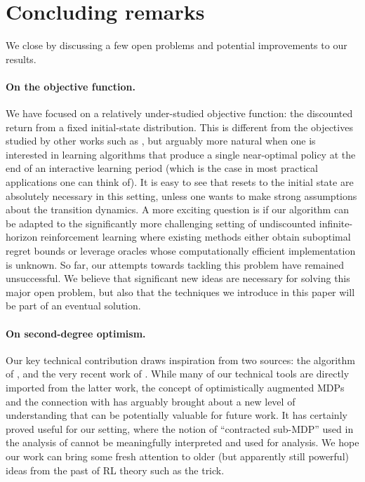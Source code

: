 \section{Concluding remarks}\label{sec:conclusion}

We close by discussing a few open problems and potential improvements to our results.

\paragraph{On the objective function.} We have focused on a relatively under-studied objective function: the discounted return from a fixed initial-state distribution. This is different from the objectives studied by other works such as \citet{liu2020regret,he2021nearly,zhou2021provably}, but arguably more natural when one is interested in learning algorithms that produce a single near-optimal policy at the end of an interactive learning period (which is the case in most practical applications one can think of). It is easy to see that resets to the initial state are absolutely necessary in this setting, unless one wants to make strong assumptions about the transition dynamics. A more exciting question is if our algorithm can be adapted to the significantly more challenging setting of undiscounted infinite-horizon reinforcement learning where existing methods \citep{WJLJ20,hong2024provably,he2024sample} either obtain suboptimal regret bounds or leverage oracles whose computationally efficient implementation is unknown. So far, our attempts towards tackling this problem have remained unsuccessful. We believe that significant new ideas are necessary for solving this major open problem, but also that the techniques we introduce in this paper will be part of an eventual solution.

\paragraph{On second-degree optimism.} Our key technical contribution draws inspiration from two sources: the \RMAXalg algorithm of \citet{brafman2002r}, and the very recent work of \citet{cassel2024warmupfree}. While many of our technical tools are directly imported from the latter work, the concept of optimistically augmented MDPs and the connection with \RMAXalg has arguably brought about a new level of understanding that can be potentially valuable for future work. It has certainly proved useful for our setting, where the notion of ``contracted sub-MDP'' used in the analysis of \citet{cassel2024warmupfree} cannot be meaningfully interpreted and used for analysis. We hope our work can bring some fresh attention to older (but apparently still powerful) ideas from the past of RL theory such as the \RMAXalg trick.

